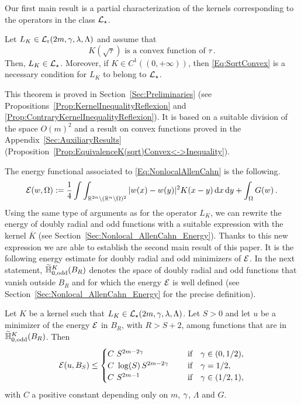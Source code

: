 Our first main result is a partial characterization of the kernels corresponding to the operators in the class $\mathcal{L}_\star$.

\begin{theorem}
	\label{Th:CharacterizationLstar}
	Let $L_K \in \mathcal{L}_{\mathrm{r}}(2m,\gamma,\lambda, \Lambda)$ and assume that 
	\begin{equation}
		\label{Eq:SqrtConvex}	
		K(\sqrt{\tau}) \text{ is a convex function of }\tau\,.
	\end{equation}
	Then, $L_K\in \mathcal{L}_\star$. Moreover, if $K\in C^1((0,+\infty))$, then \eqref{Eq:SqrtConvex} is a necessary condition for $L_K$ to belong to $\mathcal{L}_\star$.
\end{theorem}

This theorem is proved in Section~\ref{Sec:Preliminaries} (see Propositions~\ref{Prop:KernelInequalityReflexion} and \ref{Prop:ContraryKernelInequalityReflexion}). It is based on a suitable division of the space $O(m)^2$ and a result on convex functions proved in the Appendix~\ref{Sec:AuxiliaryResults} (Proposition~\ref{Prop:EquivalenceK(sqrt)Convex<->Inequality}).




The energy functional associated to \eqref{Eq:NonlocalAllenCahn} is the following.
\begin{equation}
\label{Eq:Energy}
\mathcal{E}(w, \Omega) := \dfrac{1}{4}\int\int_{\mathbb{R}^{2n} \setminus (\mathbb{R}^n\setminus\Omega)^2} |w(x) - w(y)|^2 K(x-y) \,\mathrm{d} x \,\mathrm{d} y + \int_{\Omega} G(w)\,.
\end{equation}
Using the same type of arguments as for the operator $L_K$, we can rewrite the energy of doubly radial and odd functions with a suitable expression with the kernel $\overline{K}$ (see Section~\ref{Sec:Nonlocal_AllenCahn_Energy}). Thanks to this new expression we are able to establish the second main result of this paper. It is the following energy estimate for doubly radial and odd minimizers of $\mathcal{E}$. In the next statement, $\widetilde{\mathbb{H}}^K_{0, \mathrm{odd}}(B_R)$ denotes the space of doubly radial and odd functions that vanish outside $B_R$ and for which the energy $\mathcal{E}$ is well defined (see Section~\ref{Sec:Nonlocal_AllenCahn_Energy} for the precise definition).

\begin{theorem}
	\label{Th:EnergyEstimate} 
	Let $K$ be a kernel such that $L_K\in \mathcal{L}_\star(2m, \gamma, \lambda, \Lambda)$. Let $S>0$ and let $u$ be a minimizer of the energy $\mathcal{E}$ in $B_{R}$, with $R>S+2$, among functions that are in $\widetilde{\mathbb{H}}^K_{0, \mathrm{odd}}(B_R)$. Then
	$$ \mathcal{E} (u,B_S) \leq \begin{cases}
	C \ S^{2m-2\gamma}\ \ \ \ &\textrm{if } \ \ \gamma\in(0,1/2),\\
	C\ \log(S)\,S^{2m-2\gamma}\ \ \ \ &\textrm{if } \ \ \gamma=1/2,\\
	C \ S^{2m-1}\ \ \ \ &\textrm{if } \ \ \gamma\in(1/2,1),\\
	\end{cases} $$
	with $C$ a positive constant depending only on $m$, $\gamma$, $\Lambda$ and $G$.
\end{theorem}



